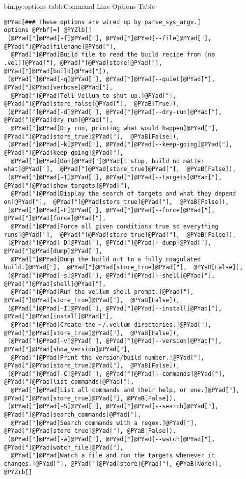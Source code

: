 \begin{code}{bin.py:options table}{Command Line Options Table}
\begin{Verbatim}[commandchars=@\[\]]
@PYaE[### These options are wired up by parse_sys_argv.]
options @PYbf[=] @PYZlb[]
 (@PYad["]@PYad[-f]@PYad["], @PYad["]@PYad[--file]@PYad["], @PYad["]@PYad[filename]@PYad["], 
  @PYad["]@PYad[Build file to read the build recipe from (no .vel)]@PYad["], @PYad["]@PYad[store]@PYad["], @PYad["]@PYad[build]@PYad["]),
 (@PYad["]@PYad[-q]@PYad["], @PYad["]@PYad[--quiet]@PYad["],  @PYad["]@PYad[verbose]@PYad["],  
  @PYad["]@PYad[Tell Vellum to shut up.]@PYad["],  @PYad["]@PYad[store_false]@PYad["],  @PYaB[True]),
 (@PYad["]@PYad[-d]@PYad["], @PYad["]@PYad[--dry-run]@PYad["],  @PYad["]@PYad[dry_run]@PYad["],  
  @PYad["]@PYad[Dry run, printing what would happen]@PYad["],  @PYad["]@PYad[store_true]@PYad["],  @PYaB[False]),
 (@PYad["]@PYad[-k]@PYad["], @PYad["]@PYad[--keep-going]@PYad["],  @PYad["]@PYad[keep_going]@PYad["],  
  @PYad["]@PYad[Don]@PYad[']@PYad[t stop, build no matter what]@PYad["],  @PYad["]@PYad[store_true]@PYad["],  @PYaB[False]),
 (@PYad["]@PYad[-T]@PYad["], @PYad["]@PYad[--targets]@PYad["],  @PYad["]@PYad[show_targets]@PYad["],  
  @PYad["]@PYad[Display the search of targets and what they depend on]@PYad["],  @PYad["]@PYad[store_true]@PYad["],  @PYaB[False]),
 (@PYad["]@PYad[-F]@PYad["], @PYad["]@PYad[--force]@PYad["],  @PYad["]@PYad[force]@PYad["],  
  @PYad["]@PYad[Force all given conditions true so everything runs]@PYad["],  @PYad["]@PYad[store_true]@PYad["],  @PYaB[False]),
 (@PYad["]@PYad[-D]@PYad["], @PYad["]@PYad[--dump]@PYad["],  @PYad["]@PYad[dump]@PYad["],  
  @PYad["]@PYad[Dump the build out to a fully coagulated build.]@PYad["],  @PYad["]@PYad[store_true]@PYad["],  @PYaB[False]),
 (@PYad["]@PYad[-s]@PYad["], @PYad["]@PYad[--shell]@PYad["],  @PYad["]@PYad[shell]@PYad["],  
  @PYad["]@PYad[Run the vellum shell prompt.]@PYad["],  @PYad["]@PYad[store_true]@PYad["],  @PYaB[False]),
 (@PYad["]@PYad[-I]@PYad["], @PYad["]@PYad[--install]@PYad["],  @PYad["]@PYad[install]@PYad["],  
  @PYad["]@PYad[Create the ~/.vellum directories.]@PYad["],  @PYad["]@PYad[store_true]@PYad["],  @PYaB[False]),
 (@PYad["]@PYad[-v]@PYad["], @PYad["]@PYad[--version]@PYad["],  @PYad["]@PYad[show_version]@PYad["],  
  @PYad["]@PYad[Print the version/build number.]@PYad["],  @PYad["]@PYad[store_true]@PYad["],  @PYaB[False]),
 (@PYad["]@PYad[-C]@PYad["], @PYad["]@PYad[--commands]@PYad["], @PYad["]@PYad[list_commands]@PYad["], 
  @PYad["]@PYad[List all commands and their help, or one.]@PYad["], @PYad["]@PYad[store_true]@PYad["], @PYaB[False]),
 (@PYad["]@PYad[-S]@PYad["], @PYad["]@PYad[--search]@PYad["], @PYad["]@PYad[search_commands]@PYad["], 
  @PYad["]@PYad[Search commands with a regex.]@PYad["], @PYad["]@PYad[store_true]@PYad["], @PYaB[False]),
 (@PYad["]@PYad[-w]@PYad["], @PYad["]@PYad[--watch]@PYad["], @PYad["]@PYad[watch_file]@PYad["], 
  @PYad["]@PYad[Watch a file and run the targets whenever it changes.]@PYad["], @PYad["]@PYad[store]@PYad["], @PYaB[None]),
@PYZrb[]
\end{Verbatim}

\end{code}

